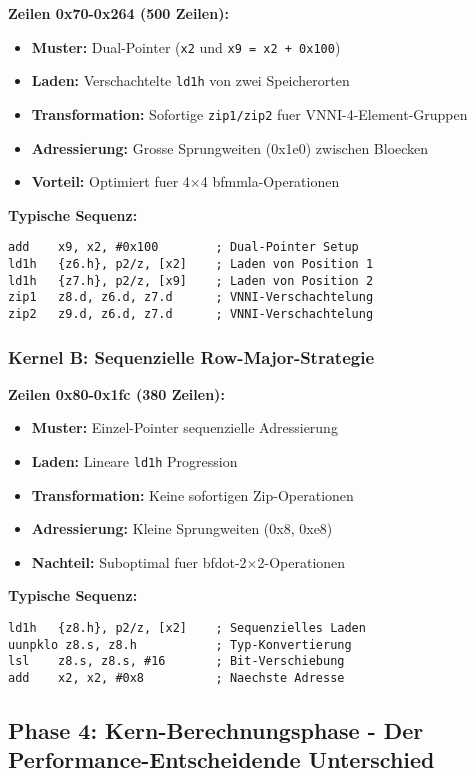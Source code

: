 \documentclass[11pt,a4paper]{article}
\begin{document}
\textbf{Zeilen 0x70-0x264 (500 Zeilen):}
\begin{itemize}
\item \textbf{Muster:} Dual-Pointer (\texttt{x2} und \texttt{x9 = x2 + 0x100}) 
\item \textbf{Laden:} Verschachtelte \texttt{ld1h} von zwei Speicherorten
\item \textbf{Transformation:} Sofortige \texttt{zip1/zip2} fuer VNNI-4-Element-Gruppen
\item \textbf{Adressierung:} Grosse Sprungweiten (0x1e0) zwischen Bloecken
\item \textbf{Vorteil:} Optimiert fuer 4$\times$4 bfmmla-Operationen
\end{itemize}

\textbf{Typische Sequenz:}
\begin{verbatim}
add    x9, x2, #0x100        ; Dual-Pointer Setup
ld1h   {z6.h}, p2/z, [x2]    ; Laden von Position 1
ld1h   {z7.h}, p2/z, [x9]    ; Laden von Position 2
zip1   z8.d, z6.d, z7.d      ; VNNI-Verschachtelung
zip2   z9.d, z6.d, z7.d      ; VNNI-Verschachtelung
\end{verbatim}

\subsubsection{Kernel B: Sequenzielle Row-Major-Strategie}

\textbf{Zeilen 0x80-0x1fc (380 Zeilen):}
\begin{itemize}
\item \textbf{Muster:} Einzel-Pointer sequenzielle Adressierung
\item \textbf{Laden:} Lineare \texttt{ld1h} Progression  
\item \textbf{Transformation:} Keine sofortigen Zip-Operationen
\item \textbf{Adressierung:} Kleine Sprungweiten (0x8, 0xe8) 
\item \textbf{Nachteil:} Suboptimal fuer bfdot-2$\times$2-Operationen
\end{itemize}

\textbf{Typische Sequenz:}
\begin{verbatim}
ld1h   {z8.h}, p2/z, [x2]    ; Sequenzielles Laden
uunpklo z8.s, z8.h           ; Typ-Konvertierung
lsl    z8.s, z8.s, #16       ; Bit-Verschiebung  
add    x2, x2, #0x8          ; Naechste Adresse
\end{verbatim}

\subsection{Phase 4: Kern-Berechnungsphase - Der Performance-Entscheidende Unterschied}
\end{document}

